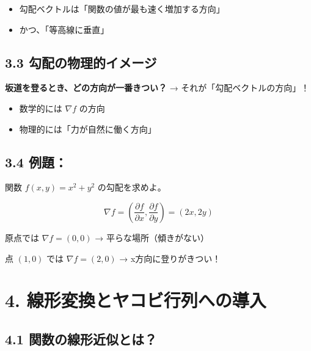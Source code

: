 \documentclass[a4j,11pt]{jsarticle}
\begin{document}
\begin{itemize}
  \item 勾配ベクトルは「関数の値が最も速く増加する方向」
  \item かつ、「等高線に垂直」
\end{itemize}

\begin{center}
\end{center}

\subsection*{3.3 勾配の物理的イメージ}

\textbf{坂道を登るとき、どの方向が一番きつい？}  
→ それが「勾配ベクトルの方向」！

\begin{itemize}
  \item 数学的には $\nabla f$ の方向
  \item 物理的には「力が自然に働く方向」
\end{itemize}

\subsection*{3.4 例題：}
関数 $f(x, y) = x^2 + y^2$ の勾配を求めよ。

\[
\nabla f = \left( \frac{\partial f}{\partial x}, \frac{\partial f}{\partial y} \right) = (2x, 2y)
\]

原点では $\nabla f = (0, 0)$  
→ 平らな場所（傾きがない）

点 $(1, 0)$ では $\nabla f = (2, 0)$  
→ x方向に登りがきつい！

\section*{4. 線形変換とヤコビ行列への導入}

\subsection*{4.1 関数の線形近似とは？}
\end{document}
